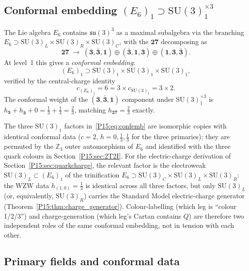 \documentclass[11pt,a4paper]{article}
\theoremstyle{definition}\newtheorem{definition}[theorem]{Definition}
\theoremstyle{remark}
\newcommand{\SU}{\mathrm{SU}}
\begin{document}
\subsection{Conformal embedding $(E_6)_1\supset\SU(3)_1^{\times 3}$}
\label{P15:sec:embed}

The Lie algebra $E_6$ contains $\mathfrak{su}(3)^3$ as a
maximal subalgebra via the branching
$E_6\supset\SU(3)_L\times\SU(3)_R\times\SU(3)_C$,
with the $\mathbf{27}$ decomposing as
\begin{equation}
  \mathbf{27} \;\to\;
  (\mathbf{3},\bar{\mathbf{3}},\mathbf{1})
  \oplus(\bar{\mathbf{3}},\mathbf{1},\mathbf{3})
  \oplus(\mathbf{1},\mathbf{3},\bar{\mathbf{3}}).
  \label{P15:eq:27branch}
\end{equation}
At level~1 this gives a \emph{conformal embedding}:
\begin{equation}
  (E_6)_1 \supset \SU(3)_1 \times \SU(3)_1 \times \SU(3)_1,
  \label{P15:eq:confemb}
\end{equation}
verified by the central-charge identity
\begin{equation}
  c_{(E_6)_1} = 6 = 3\times c_{\SU(3)_1} = 3\times 2.
  \label{P15:eq:cematch}
\end{equation}
The conformal weight of the $(\mathbf{3},\bar{\mathbf{3}},\mathbf{1})$
component under $\SU(3)_1^{\times 3}$ is
$h_{\mathbf{3}}+h_{\bar{\mathbf{3}}}+0=\tfrac{1}{3}+\tfrac{1}{3}
=\tfrac{2}{3}$,
matching $h_{\mathbf{27}}=\tfrac{2}{3}$ exactly.

The three $\SU(3)_1$ factors in~\eqref{P15:eq:confemb} are isomorphic
copies with identical conformal data ($c=2$, $h=0,\tfrac13,\tfrac13$
for the three primaries); they are permuted by the $\mathbb{Z}_3$
outer automorphism of $E_6$ and identified with the three quark
colours in Section~\ref{P15:sec:2T2I}. For the electric-charge
derivation of Section~\ref{P15:sec:quarkcharge}, the relevant factor is
the electroweak $\SU(3)_L\subset(E_6)_1$ of the trinification
$E_6\supset\SU(3)_C\times\SU(3)_L\times\SU(3)_R$: the WZW data
$h_{(1,0)}=\tfrac13$ is identical across all three factors, but
only $\SU(3)_L$ (or, equivalently, $\SU(3)_R$) carries the Standard
Model electric-charge generator (Theorem~\ref{P15:thm:charge_generator}).
Colour-labelling (which leg is ``colour 1/2/3'') and
charge-generation (which leg's Cartan contains $Q$) are therefore
two independent roles of the same conformal embedding, not in
tension with each other.

\subsection{Primary fields and conformal data}
\end{document}
